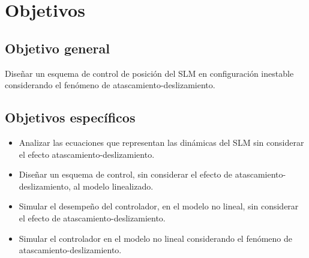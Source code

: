 \chapter{Objetivos}

\section{Objetivo general}
Diseñar un esquema de control de posición del SLM en configuración inestable considerando el fenómeno de atascamiento-deslizamiento.

\section{Objetivos específicos}
\begin{itemize}
	\item Analizar las ecuaciones que representan las dinámicas del SLM sin considerar el efecto atascamiento-deslizamiento. 
	\item Diseñar un esquema de control, sin considerar el efecto de atascamiento-deslizamiento, al modelo linealizado.
	\item Simular el desempeño del controlador, en el modelo no lineal, sin considerar el efecto de atascamiento-deslizamiento.
	\item Simular el controlador en el modelo no lineal considerando el fenómeno de atascamiento-deslizamiento.
\end{itemize}
